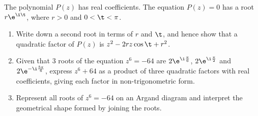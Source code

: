 \begin{problem}
    The polynomial $P(z)$ has real coefficients. The equation $P(z) = 0$ has a root $r\e^{\i\t}$, where $r > 0$ and $0 < \t < \pi$.

    \begin{enumerate}
        \item Write down a second root in terms of $r$ and $\t$, and hence show that a quadratic factor of $P(z)$ is $z^2 - 2rz\cos\t + r^2$.
        \item Given that 3 roots of the equation $z^6 = -64$ are $2\e^{\i \frac\pi6}$, $2\e^{\i\frac\pi2}$ and $2\e^{-\i\frac{5\pi}6}$, express $z^6 + 64$ as a product of three quadratic factors with real coefficients, giving each factor in non-trigonometric form.
        \item Represent all roots of $z^6 = -64$ on an Argand diagram and interpret the geometrical shape formed by joining the roots.
    \end{enumerate}
\end{problem}
